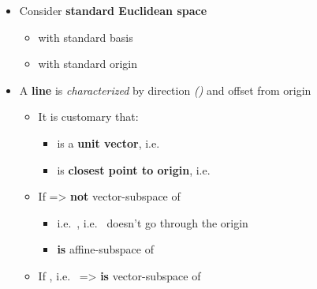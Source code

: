 \begin{itemize}

\item
  Consider \textbf{standard Euclidean space}

  \begin{itemize}
  
  \item
    with standard basis
  \item
    with standard origin 
  \end{itemize}
\item
  A \textbf{line}  is
  \emph{characterized} by direction
  \emph{()} and offset from origin

  \begin{itemize}
  
  \item
    It is customary that:

    \begin{itemize}
    
    \item
       is a \textbf{unit vector},
      i.e.~
    \item
       is \textbf{closest point to origin},
      i.e.~
    \end{itemize}
  \item
    If  =\textgreater{}
     \textbf{not} vector-subspace of 

    \begin{itemize}
    
    \item
      i.e.~, i.e.~ doesn't go
      through the origin
    \item
       \textbf{is} affine-subspace of 
    \end{itemize}
  \item
    If ,
    i.e.~ =\textgreater{}
     \textbf{is} vector-subspace of 


\end{itemize}
\end{itemize}
